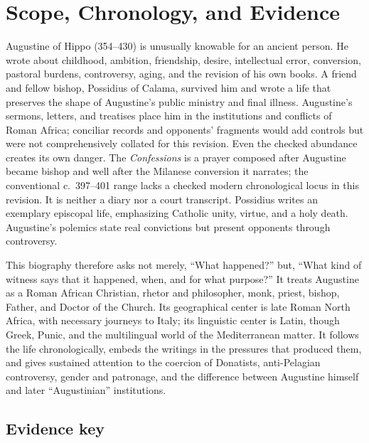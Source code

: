 \section{Scope, Chronology, and Evidence}\label{sec:aug-method}

Augustine of Hippo (354--430) is unusually knowable for
an ancient person. He wrote about childhood, ambition, friendship, desire,
intellectual error, conversion, pastoral burdens, controversy, aging, and the
revision of his own books. A friend and fellow bishop, Possidius of Calama,
survived him and wrote a life that preserves the shape of Augustine's public
ministry and final illness. Augustine's sermons, letters, and treatises place
him in the institutions and conflicts of Roman Africa; conciliar records and
opponents' fragments would add controls but were not comprehensively collated
for this revision. Even the checked abundance creates its own danger. The
\emph{Confessions} is a prayer composed after Augustine became bishop and well
after the Milanese conversion it narrates; the conventional c.~397--401 range
lacks a checked modern chronological locus in this revision. It is neither a diary nor a court
transcript. Possidius writes an exemplary episcopal life, emphasizing Catholic
unity, virtue, and a holy death. Augustine's polemics state real convictions
but present opponents through controversy.

This biography therefore asks not merely, “What happened?” but, “What kind
of witness says that it happened, when, and for what purpose?” It treats
Augustine as a Roman African Christian, rhetor and philosopher, monk, priest,
bishop, Father, and Doctor of the Church. Its geographical center is late Roman
North Africa, with necessary journeys to Italy; its linguistic center is
Latin, though Greek, Punic, and the multilingual world of the Mediterranean
matter. It follows the life chronologically, embeds the writings in the
pressures that produced them, and gives sustained attention to the coercion of
Donatists, anti-Pelagian controversy, gender and patronage, and the difference
between Augustine himself and later “Augustinian” institutions.

\subsection{Evidence key}

